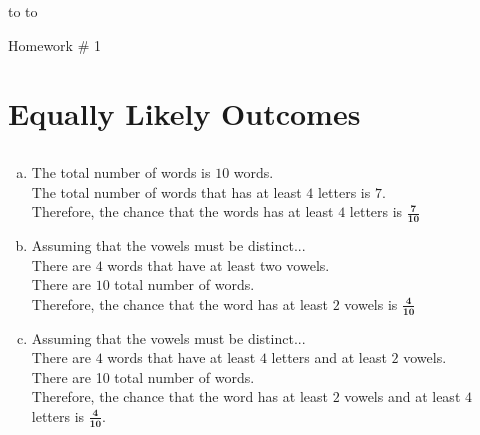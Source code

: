 \documentclass[10pt]{report}
\newcommand{\handout}{
   \renewcommand{\thepage}{}
   \noindent
   \begin{center}
      \vbox{
    \hbox to \columnwidth {\sc{\course} --- \prof \hfill}
    \vspace{-2mm}
    \hbox to \columnwidth {\sc due \MakeLowercase{\duedate} \duelocation \hfill {\LARGE\color{mdb}\yourid}}
      }
   \end{center}
      Homework \# 1
   \vspace*{2mm}
}
\begin{document}
\thispagestyle{empty}
\handout

\setcounter{chapter}{1}
\section{\sc\color{cit}Equally Likely Outcomes}
\setcounter{subsection}{1}
\subsection{}
 \begin{enumerate}[(a)]
        \item The total number of words is $10 $ words.\ \\ The total number of words that has at least $4$ letters is $7$. \ \\ Therefore, the chance that the words has at least $4$ letters is $\mathbf{\frac{7}{10}}$
        \item Assuming that the vowels must be distinct... \ \\ There are $4 $ words that have at least two vowels. \ \\ There are $10$  total number of words. \ \\ Therefore, the chance that the word has at least $2 $ vowels is $\mathbf{\frac{4}{10}}$
        \item Assuming that the vowels must be distinct... \ \\ There are $4 $ words that have at least $4 $ letters and at least $2 $ vowels. \ \\ There are 10 total number of words. \ \\ Therefore, the chance that the word has at least $2 $ vowels and at least $4 $ letters is $\mathbf{\frac{4}{10}} $. 
    \end{enumerate}
\end{document}

